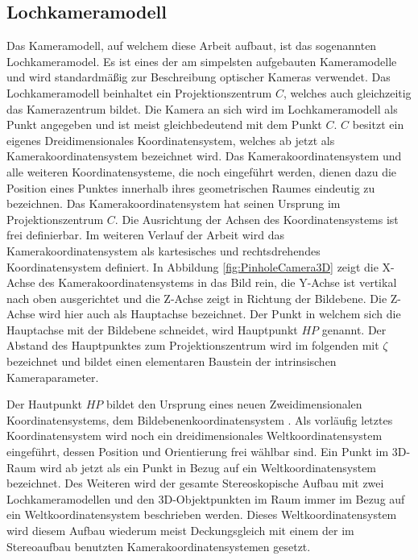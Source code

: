 \subsection{Lochkameramodell}

Das Kameramodell, auf welchem diese Arbeit aufbaut, ist das sogenannten Lochkameramodel. Es ist eines der am simpelsten aufgebauten Kameramodelle und wird standardmäßig zur Beschreibung optischer Kameras verwendet. Das Lochkameramodell beinhaltet ein Projektionszentrum $C$, welches auch gleichzeitig das Kamerazentrum bildet. Die Kamera an sich wird im Lochkameramodell als Punkt angegeben und ist meist gleichbedeutend mit dem Punkt $C$. $C$ besitzt ein eigenes Dreidimensionales Koordinatensystem, welches ab jetzt als Kamerakoordinatensystem bezeichnet wird. Das Kamerakoordinatensystem und alle weiteren Koordinatensysteme, die noch eingeführt werden, dienen dazu die Position eines Punktes innerhalb ihres geometrischen Raumes eindeutig zu bezeichnen. Das Kamerakoordinatensystem hat seinen Ursprung im Projektionszentrum $C$. Die Ausrichtung der Achsen des Koordinatensystems ist frei definierbar. Im weiteren Verlauf der Arbeit wird das Kamerakoordinatensystem als kartesisches und rechtsdrehendes Koordinatensystem definiert. In Abbildung \ref{fig:PinholeCamera3D} zeigt die X-Achse des Kamerakoordinatensystems in das Bild rein, die Y-Achse ist vertikal nach oben ausgerichtet und die Z-Achse zeigt in Richtung der Bildebene. Die Z-Achse wird hier auch als Hauptachse bezeichnet. Der Punkt in welchem sich die Hauptachse mit der Bildebene schneidet, wird Hauptpunkt $HP$ genannt. Der Abstand des Hauptpunktes zum Projektionszentrum wird im folgenden mit $\zeta$ bezeichnet und bildet einen elementaren Baustein der intrinsischen Kameraparameter. 

Der Hautpunkt $HP$ bildet den Ursprung eines neuen Zweidimensionalen Koordinatensystems, dem Bildebenenkoordinatensystem \cite{HZ}. Als vorläufig letztes Koordinatensystem wird noch ein dreidimensionales Weltkoordinatensystem eingeführt, dessen Position und Orientierung frei wählbar sind. Ein Punkt im 3D-Raum wird ab jetzt als ein Punkt in Bezug auf ein Weltkoordinatensystem bezeichnet. Des Weiteren wird der gesamte Stereoskopische Aufbau mit zwei Lochkameramodellen und den 3D-Objektpunkten im Raum immer im Bezug auf ein Weltkoordinatensystem beschrieben werden. Dieses Weltkoordinatensystem wird diesem Aufbau wiederum meist Deckungsgleich mit einem der im Stereoaufbau benutzten Kamerakoordinatensystemen gesetzt.


